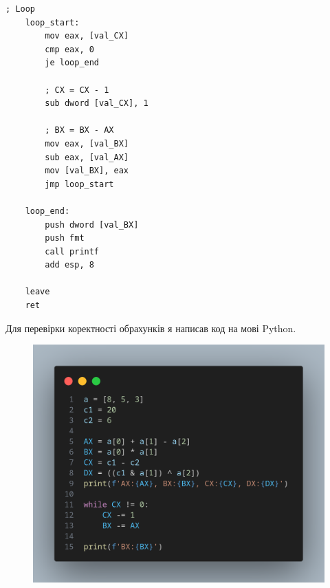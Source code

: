 \documentclass[a4paper,12pt]{article}
\begin{document}
\newpage
    \begin{lstlisting}[language=assembler]
    ; Loop
    loop_start:
        mov eax, [val_CX]
        cmp eax, 0
        je loop_end

        ; CX = CX - 1
        sub dword [val_CX], 1

        ; BX = BX - AX
        mov eax, [val_BX]
        sub eax, [val_AX]
        mov [val_BX], eax
        jmp loop_start

    loop_end:
        push dword [val_BX]
        push fmt
        call printf
        add esp, 8

    leave
    ret
    \end{lstlisting}
    Для перевірки коректності обрахунків я написав код на мові Python.
    \begin{figure}[h!]
        \begin{minipage}[h]{1\linewidth}
            \centering
            \includegraphics[width=0.8\linewidth]{Prt sc/python_code_1.png}  
        \end{minipage}
    \end{figure}
\end{document}
